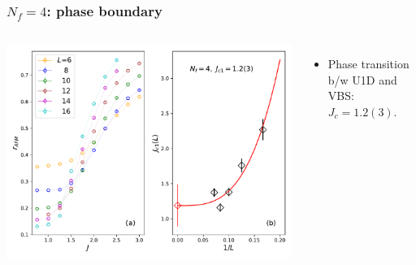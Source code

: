 \documentclass[xcolor=table, 10pt, aspectratio=169]{beamer}
\begin{document}
\begin{frame}
  \frametitle{$N_f=4$: phase boundary}
  \begin{columns}
    \includegraphics[width=\textwidth]{n4rvbs}
		\begin{itemize}
			\item Phase transition b/w U1D and VBS: $J_c=1.2(3)$.
		\end{itemize}
  \end{columns}
\end{frame}
\end{document}
